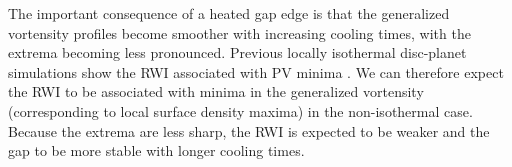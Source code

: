 
The important consequence of a heated gap edge is that the
generalized vortensity profiles become smoother with increasing
cooling times, with the extrema becoming less pronounced. Previous locally
isothermal disc-planet simulations show the RWI associated with PV
minima \citep{li05,lin10}. We can therefore expect the RWI to be associated with
minima in the generalized vortensity (corresponding to local surface
density maxima) in the non-isothermal case. Because the extrema are
less sharp, the RWI is expected to be weaker and the gap to be more
stable with longer cooling times.  


